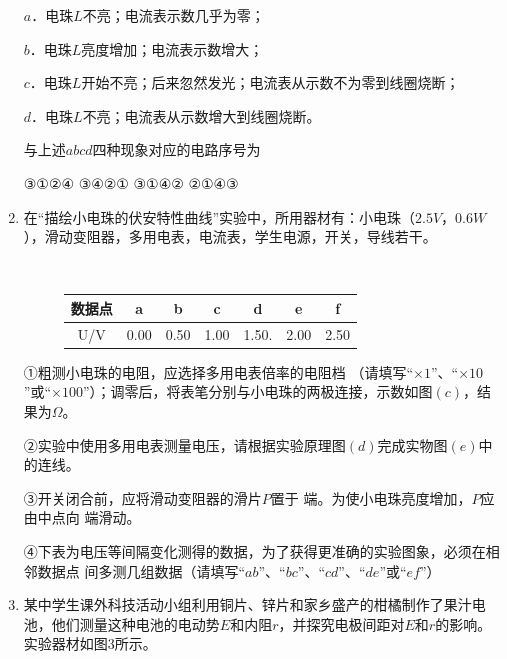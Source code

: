 \begin{enumerate}[leftmargin=0em]
$ a $．电珠$ L $不亮；电流表示数几乎为零；

$ b $．电珠$ L $亮度增加；电流表示数增大；

$ c $．电珠$ L $开始不亮；后来忽然发光；电流表从示数不为零到线圈烧断；

$ d $．电珠$ L $不亮；电流表从示数增大到线圈烧断。

与上述$ abcd $四种现象对应的电路序号为  

\fourchoices
{③①②④ }
{③④②①}
{③①④② }
{②①④③}


\newpage
\item 
{}
在“描绘小电珠的伏安特性曲线”实验中，所用器材有：小电珠（$ 2.5V $，$ 0.6W $），滑动变阻器，多用电表，电流表，学生电源，开关，导线若干。
\begin{figure}[h!]
\centering
\\
\vspace{2em}
 \begin{tabular}{|c|c|c|c|c|c|c|}
\hline 
数据点 & a & b & c & d & e & f
 \\
\hline
U/V & 0.00 & 0.50 & 1.00 & 1.50. & 2.00 & 2.50\\ 
\hline 
\end{tabular}
\end{figure}




①粗测小电珠的电阻，应选择多用电表倍率的电阻档  
（请填写“$ \times 1 $”、“$ \times 10 $”或“$ \times 100 $”）；调零后，将表笔分别与小电珠的两极连接，示数如图$ (c) $，结果为$ \Omega $。 

②实验中使用多用电表测量电压，请根据实验原理图$ (d) $完成实物图$ (e) $中的连线。

③开关闭合前，应将滑动变阻器的滑片$ P $置于  
端。为使小电珠亮度增加，$ P $应由中点向  
端滑动。

④下表为电压等间隔变化测得的数据，为了获得更准确的实验图象，必须在相邻数据点  
间多测几组数据（请填写“$ ab $”、“$ bc $”、“$ cd $”、“$ de $”或“$ ef $”）





\item 
{}
某中学生课外科技活动小组利用铜片、锌片和家乡盛产的柑橘制作了果汁电池，他们测量这种电池的电动势$ E $和内阻$ r $，并探究电极间距对$ E $和$ r $的影响。实验器材如图$ 3 $所示。
\begin{figure}[h!]
\centering

\end{figure}



\end{enumerate}
